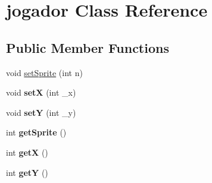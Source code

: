 \hypertarget{classjogador}{\section{jogador Class Reference}
\label{classjogador}
}
\subsection*{Public Member Functions}
\begin{DoxyCompactItemize}
\item 
void \hyperlink{classjogador_a21a1cea1ac07de11a610e1396fbe051e}{set\-Sprite} (int n)
\item 
\hypertarget{classjogador_a81cb6f937c517166101072c78566dec1}{void {\bfseries set\-X} (int \-\_\-x)}\label{classjogador_a81cb6f937c517166101072c78566dec1}

\item 
\hypertarget{classjogador_a82ae9736c8872e7ce50b68fc33911ab4}{void {\bfseries set\-Y} (int \-\_\-y)}\label{classjogador_a82ae9736c8872e7ce50b68fc33911ab4}

\item 
\hypertarget{classjogador_a7bd2339555bbec728017b72ee7daa152}{int {\bfseries get\-Sprite} ()}\label{classjogador_a7bd2339555bbec728017b72ee7daa152}

\item 
\hypertarget{classjogador_aae89c16a5371ef07188a29c04ccc6f7d}{int {\bfseries get\-X} ()}\label{classjogador_aae89c16a5371ef07188a29c04ccc6f7d}

\item 
\hypertarget{classjogador_a033f17eea3b115705133ba1b26e7565b}{int {\bfseries get\-Y} ()}\label{classjogador_a033f17eea3b115705133ba1b26e7565b}

\end{DoxyCompactItemize}
